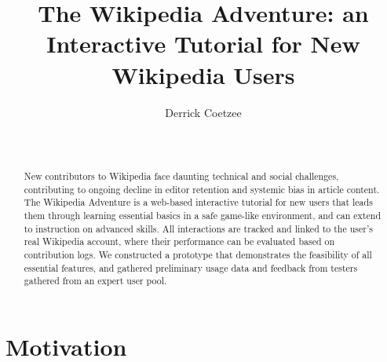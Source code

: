 \documentclass{acm_proc_article-sp}
\begin{document}
\title{The Wikipedia Adventure: an Interactive Tutorial for New Wikipedia Users}

\author{
\alignauthor
Derrick Coetzee \\
       \\
       \\
}

\maketitle

\begin{abstract}
New contributors to Wikipedia face daunting technical and social challenges, contributing to ongoing decline in editor retention and systemic bias in article content. The Wikipedia Adventure is a web-based interactive tutorial for new users that leads them through learning essential basics in a safe game-like environment, and can extend to instruction on advanced skills. All interactions are tracked and linked to the user's real Wikipedia account, where their performance can be evaluated based on contribution logs. We constructed a prototype that demonstrates the feasibility of all essential features, and gathered preliminary usage data and feedback from testers gathered from an expert user pool.
\end{abstract}


\section{Motivation}
\end{document}
